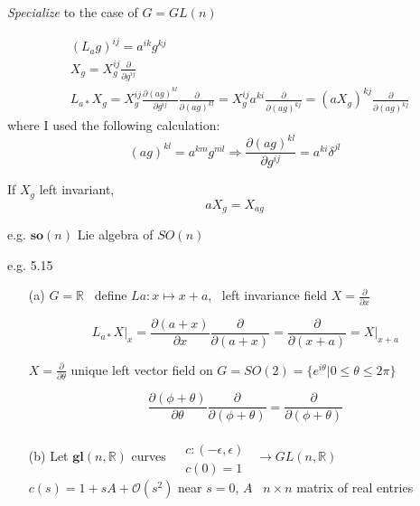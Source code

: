 \documentclass{book}
\begin{document}
\emph{Specialize} to the case of $G = GL(n)$

\[
\begin{aligned}
  & (L_ag)^{ij} = a^{ik} g^{kj} \\ 
  & X_g = X^{ij}_g \frac{ \partial }{ \partial g^{ij} } \\ 
  & L_{a*} X_g = X^{ij}_g \frac{ \partial (ag)^{kl} }{ \partial g^{ij}} \frac{ \partial }{ \partial (ag)^{kl} } = X^{ij}_g a^{ki} \frac{ \partial }{ \partial (ag)^{kj} } = (aX_g)^{kj} \frac{ \partial }{ \partial (ag)^{kj}}
\end{aligned}
\]
where I used the following calculation:
\[
(ag)^{kl} = a^{km} g^{ml} \Longrightarrow \frac{ \partial (ag)^{kl}}{ \partial g^{ij}} = a^{ki} \delta^{jl}
\]

If $X_g$ left invariant,
\[
aX_g=X_{ag}
\]



\hrulefill

e.g. $\mathbf{so}(n)$ Lie algebra of $SO(n)$

e.g. 5.15 
\begin{enumerate}
\item[(a)] $G = \mathbb{R}$  \quad \quad \, define $La : x \mapsto x + a$,  \quad \, left invariance field $X = \frac{ \partial }{ \partial x }$  

\[
L_{a*} \left. X \right|_x = \frac{ \partial (a+x) }{ \partial x} \frac{ \partial }{ \partial (a+ x) } = \frac{ \partial }{ \partial (x+a) } = \left. X \right|_{x+a}
\]

$X = \frac{ \partial }{ \partial \theta}$ \quad unique left vector field on $G = SO(2) = \lbrace e^{i \theta} | 0 \leq \theta \leq 2 \pi \rbrace$ 

\[
\frac{ \partial ( \phi + \theta ) }{ \partial \theta } \frac{ \partial }{ \partial (\phi + \theta ) } = \frac{ \partial }{ \partial ( \phi + \theta ) }
\]

\item[(b)] Let $\mathbf{gl}{ (n, \mathbb{R})}$   \quad curves $\begin{aligned} & \quad \\ 
  & c : (-\epsilon , \epsilon ) \\ 
  & c(0 ) = 1 \end{aligned}$ $ \, \to GL(n, \mathbb{R})$ \quad \quad $c(s) = 1 + sA + \mathcal{O}(s^2)$ \quad near $s=0$, $A$ \, $n\times n$ matrix of real entries 
\end{enumerate}
\end{document}
